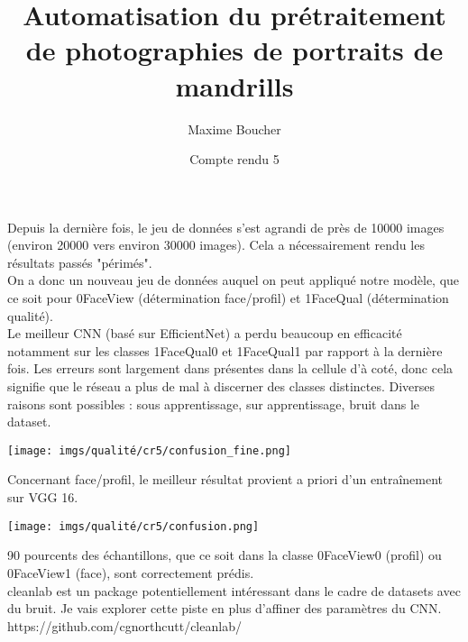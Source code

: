 \documentclass{article}
\title{Automatisation du prétraitement de photographies de portraits de mandrills}
\author{Maxime Boucher}
\date{Compte rendu 5}
\begin{document}
\maketitle

Depuis la dernière fois, le jeu de données s'est agrandi de près de  10000 images (environ 20000 vers environ 30000 images).
Cela a nécessairement rendu les résultats passés "périmés".\\

On a donc un nouveau jeu de données auquel on peut appliqué notre modèle, que ce soit pour 0FaceView (détermination face/profil) et 1FaceQual (détermination qualité). \\

Le meilleur CNN (basé sur EfficientNet) a perdu beaucoup en efficacité notamment sur les classes 1FaceQual0 et 1FaceQual1 par rapport à la dernière fois. Les erreurs sont largement dans présentes dans la cellule d'à coté, donc cela signifie que le réseau a plus de mal à discerner des classes distinctes. Diverses raisons sont possibles : sous apprentissage, sur apprentissage, bruit dans le dataset. 
\begin{center}
    \texttt{[image: imgs/qualité/cr5/confusion\_fine.png]}
\end{center}

Concernant face/profil, le meilleur résultat provient a priori d'un entraînement sur VGG 16.
\begin{center}
    \texttt{[image: imgs/qualité/cr5/confusion.png]}
\end{center}

90 pourcents des échantillons, que ce soit dans la classe 0FaceView0 (profil) ou 0FaceView1 (face), sont correctement prédis. \\

cleanlab est un package potentiellement intéressant dans le cadre de datasets avec du bruit. Je vais explorer cette piste en plus d'affiner des paramètres du CNN.
https://github.com/cgnorthcutt/cleanlab/
\end{document}
